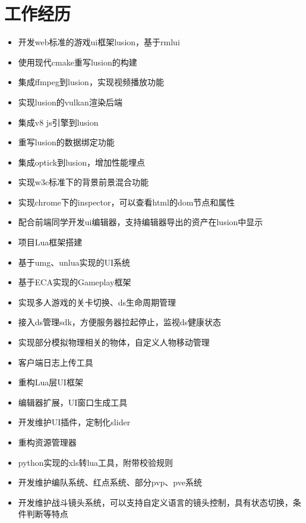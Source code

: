 \documentclass{resume}
\begin{document}
\section{工作经历}
\begin{itemize}
  \item 开发web标准的游戏ui框架lusion，基于rmlui
  \item 使用现代cmake重写lusion的构建
  \item 集成ffmpeg到lusion，实现视频播放功能
  \item 实现lusion的vulkan渲染后端
  \item 集成v8 js引擎到lusion
  \item 重写lusion的数据绑定功能
  \item 集成optick到lusion，增加性能埋点
  \item 实现w3c标准下的背景前景混合功能
  \item 实现chrome下的inspector，可以查看html的dom节点和属性
  \item 配合前端同学开发ui编辑器，支持编辑器导出的资产在lusion中显示
\end{itemize}
\begin{itemize}
  \item 项目Lua框架搭建
  \item 基于umg、unlua实现的UI系统
  \item 基于ECA实现的Gameplay框架
  \item 实现多人游戏的关卡切换、ds生命周期管理
  \item 接入ds管理sdk，方便服务器拉起停止，监视ds健康状态
  \item 实现部分模拟物理相关的物体，自定义人物移动管理
  \item 客户端日志上传工具
\end{itemize}
\begin{itemize}
  \item 重构Lua层UI框架
  \item 编辑器扩展，UI窗口生成工具
  \item 开发维护UI插件，定制化slider
  \item 重构资源管理器
  \item python实现的xls转lua工具，附带校验规则
  \item 开发维护编队系统、红点系统、部分pvp、pve系统
  \item 开发维护战斗镜头系统，可以支持自定义语言的镜头控制，具有状态切换，条件判断等特点
\end{itemize}



%
%
\end{document}
